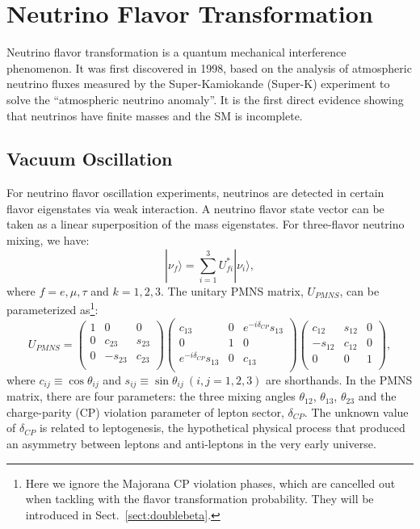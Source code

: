 \section{Neutrino Flavor Transformation}
Neutrino flavor transformation is a quantum mechanical interference phenomenon\cite{akhmedov2019quantum}. It was first discovered in 1998, based on the analysis of atmospheric neutrino fluxes measured by the Super-Kamiokande (Super-K) experiment to solve the ``atmospheric neutrino anomaly''\cite{fukuda1998evidence}. It is the first direct evidence showing that neutrinos have finite masses and the SM is incomplete.

\subsection{Vacuum Oscillation}\label{sect:VacuumOsci}
For neutrino flavor oscillation experiments, neutrinos are detected in certain flavor eigenstates via weak interaction. A neutrino flavor state vector can be taken as a linear superposition of the mass eigenstates. For three-flavor neutrino mixing, we have\cite{pdg2020}:
\begin{equation}\label{eq:mixingmatrix}
|\nu_f\rangle = \sum_{i=1}^3U^*_{fi}|\nu_i\rangle, 
\end{equation}
where $f=e,\mu,\tau$ and $k=1,2,3$. The unitary PMNS matrix, $U_{PMNS}$, can be parameterized as\footnote{Here we ignore the Majorana CP violation phases, which are cancelled out when tackling with the flavor transformation probability. They will be introduced in Sect.~\ref{sect:doublebeta}.}: 
\begin{equation}\label{eq:uPMNS}
U_{PMNS} =
\begin{pmatrix}
1 &0 &0\\
0 &c_{23} &s_{23}\\
0 &-s_{23} &c_{23}\\ 
\end{pmatrix}
\begin{pmatrix}
c_{13} &0 &e^{-i\delta_{CP}}s_{13}\\
0 &1 &0\\
e^{-i\delta_{CP}}s_{13} &0 &c_{13}\\ 
\end{pmatrix}
\begin{pmatrix}
c_{12} &s_{12} &0\\
-s_{12} &c_{12} &0\\
0 &0 &1\\ 
\end{pmatrix},
\end{equation}
where $c_{ij}\equiv \cos\theta_{ij}$ and $s_{ij}\equiv \sin\theta_{ij}~(i,j = 1,2,3)$ are shorthands.
In the PMNS matrix, there are four parameters: the three mixing angles $\theta_{12}$, $\theta_{13}$, $\theta_{23}$ and the charge-parity (CP) violation parameter of lepton sector, $\delta_{CP}$. The unknown value of $\delta_{CP}$ is related to leptogenesis, the hypothetical physical process that produced an asymmetry between leptons and anti-leptons in the very early universe\cite{wiki_cp}. 

